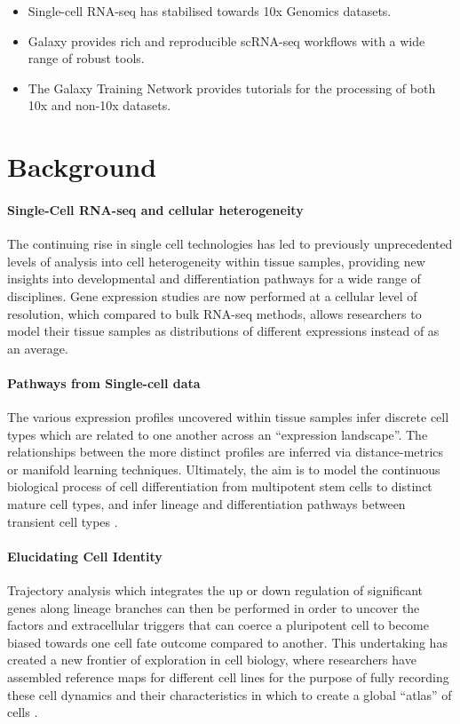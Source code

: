 \documentclass[a4paper,num-refs]{oup-contemporary}
\begin{document}
\begin{keypoints*}
\begin{itemize}
\item Single-cell RNA-seq has stabilised towards 10x Genomics datasets.
\item Galaxy provides rich and reproducible scRNA-seq workflows with a wide range of robust tools.
\item The Galaxy Training Network provides tutorials for the processing of both 10x and non-10x datasets.
\end{itemize}
\end{keypoints*}


\section{Background}
\label{sec:background}

\paragraph{Single-Cell RNA-seq and cellular heterogeneity}
The continuing rise in single cell technologies has led to previously unprecedented levels of analysis into cell heterogeneity within tissue samples, providing new insights into developmental and differentiation pathways for a wide range of disciplines. Gene expression studies are now performed at a cellular level of resolution, which compared to bulk RNA-seq methods, allows researchers to model their tissue samples as distributions of different expressions instead of as an average.

\paragraph{Pathways from Single-cell data}
The various expression profiles uncovered within tissue samples infer discrete cell types which are related to one another across an ``expression landscape''. The relationships between the more distinct profiles are inferred via distance-metrics or manifold learning techniques. Ultimately, the aim is to model the continuous biological process of cell differentiation from multipotent stem cells to distinct mature cell types, and infer lineage and differentiation pathways between transient cell types \cite{wagner2016revealing}.

\paragraph{Elucidating Cell Identity}
Trajectory analysis which integrates the up or down regulation of significant genes along lineage branches can then be performed
in order to uncover the factors and extracellular triggers that can coerce a pluripotent cell to become biased towards one cell fate outcome compared to another. This undertaking has created a new frontier of exploration in cell biology, where researchers have assembled reference maps for different cell lines for the purpose of fully recording these cell dynamics and their characteristics in which to create a global ``atlas'' of cells \citep{rozenblatt2017human,Briggs2018xenopus}.
\end{document}
